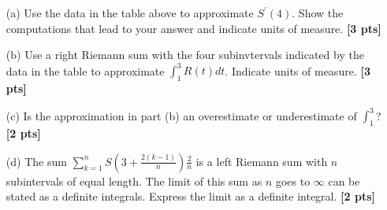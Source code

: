 \documentclass{article}
\newcommand{\qspace}{\vspace*{1.7em}}
\begin{document}
    \begin{enumerate}
        
        \item[(a)] Use the data in the table above to approximate $S^{\prime}(4)$. Show the computations that lead to your answer
                   and indicate units of measure. \textbf{[3 pts]} \qspace 
        \item[(b)] Use a right Riemann sum with the four subinvtervals indicated by the data in the table to 
                   approximate $\int_1^3 R(t)dt$. Indicate units of measure. \textbf{[3 pts]} \qspace
        \item[(c)] Is the approximation in part (b) an overestimate or underestimate of $\int_1^3$? \textbf{[2 pts]} \qspace
        \item[(d)] The sum $\sum_{k = 1}^n S\left(3 + \frac{2(k - 1)}{n}\right)\frac{2}{n}$ is a left Riemann sum with $n$ subintervals of equal length. 
                   The limit of this sum as $n$ goes to $\infty$ can be stated as a definite integrals. Express the limit as a definite integral. \textbf{[2 pts]}

    \end{enumerate}
\end{document}
